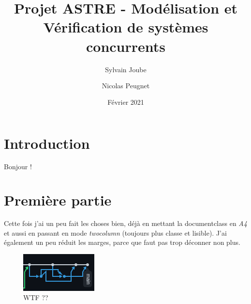 \documentclass[a4paper,twocolumn,french]{article}
\title{Projet ASTRE - Modélisation et Vérification de systèmes concurrents}
\date{Février 2021}
\author{Sylvain Joube \and Nicolas Peugnet}
\begin{document}
\maketitle

\tableofcontents

\section*{Introduction}

Bonjour !

\section{Première partie}

Cette fois j'ai un peu fait les choses bien,
déjà en mettant la documentclass en \emph{A4} et aussi en passant en mode \emph{twocolumn}
(toujours plus classe et lisible).
J'ai également un peu réduit les marges, parce que faut pas trop déconner non plus.

\begin{figure}[h]
	\centering
	\includegraphics[width=0.3\linewidth]{wtf.png} %
	\caption{WTF ??\protect\footnotemark}
	\label{fig:wtf}
\end{figure}
\end{document}
